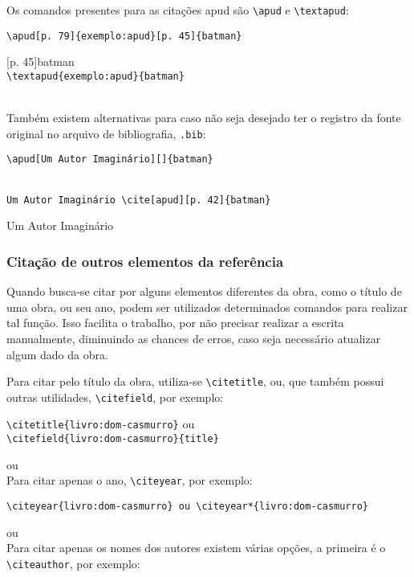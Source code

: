 Os comandos presentes para as citações apud são \verb|\apud| e \verb|\textapud|:

\verb|\apud[p. 79]{exemplo:apud}[p. 45]{batman}|

[p. 45]{batman}\\

\verb|\textapud{exemplo:apud}{batman}|

\\

Também existem alternativas para caso não seja desejado ter o registro da fonte original no arquivo de bibliografia, \texttt{.bib}:

\verb|\apud[Um Autor Imaginário][]{batman}|

\\

\verb|Um Autor Imaginário \cite[apud][p. 42]{batman}|

Um Autor Imaginário \cite[apud][p. 42]{batman}

\subsubsection{Citação de outros elementos da referência}
Quando busca-se citar por alguns elementos diferentes da obra, como o título de uma obra, ou seu ano, podem ser utilizados determinados comandos para realizar tal função. Isso facilita o trabalho, por não precisar realizar a escrita manualmente, diminuindo as chances de erros, caso seja necessário atualizar algum dado da obra.

Para citar pelo título da obra, utiliza-se \verb|\citetitle|, ou, que também possui outras utilidades, \verb|\citefield|, por exemplo: 

\verb|\citetitle{livro:dom-casmurro}| ou \\\verb|\citefield{livro:dom-casmurro}{title}|

 ou \\

Para citar apenas o ano, \verb|\citeyear|, por exemplo: 

\verb|\citeyear{livro:dom-casmurro} ou \citeyear*{livro:dom-casmurro}|

\citeyear{livro:dom-casmurro} ou \citeyear*{livro:dom-casmurro}\\

Para citar apenas os nomes dos autores existem várias opções, a primeira é o \verb|\citeauthor|, por exemplo: 

